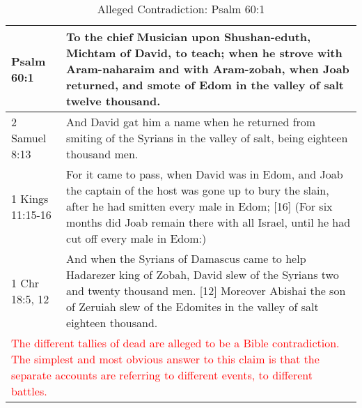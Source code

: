 \begin{center}

\begin{table}[ht]
\centering
\begin{tabular}{|p{1in}|p{3in}|}
\hline

\textcolor[rgb]{0.00,0.00,1.00}{Psalm 60:1} & \textcolor[rgb]{0.00,0.00,1.00}{To the chief Musician upon Shushan-eduth, Michtam of David, to teach; when he strove with Aram-naharaim and with Aram-zobah, when Joab returned, and smote of Edom in the valley of salt twelve thousand.} \\ \hline 

\hline
\hline


2 Samuel 8:13 &   And David gat him a name when he returned from smiting of the Syrians in the valley of salt, being eighteen thousand men.
\\ \hline
1 Kings 11:15-16 &  For it came to pass, when David was in Edom, and Joab the captain of the host was gone up to bury the slain, after he had smitten every male in Edom; [16] (For six months did Joab remain there with all Israel, until he had cut off every male in Edom:) \\ \hline
1 Chr 18:5, 12 &  And when the Syrians of Damascus came to help Hadarezer king of Zobah, David slew of the Syrians two and twenty thousand men. [12] Moreover Abishai the son of Zeruiah slew of the Edomites in the valley of salt eighteen thousand.
 \\ \hline

\hline
\hline

\multicolumn{2}{|p{4.3in}|}{{\textcolor{red}{The different tallies of dead are alleged to be a Bible contradiction. The simplest and most obvious answer to this claim is that the separate accounts are referring to different events, to different battles.}}} \\ \hline

\end{tabular}
\caption[Alleged Contradiction: Psalm 60:1]{Alleged Contradiction: Psalm 60:1} \label{table:Alleged Contradiction - Psalm 60:1}

\end{table}

\end{center}
